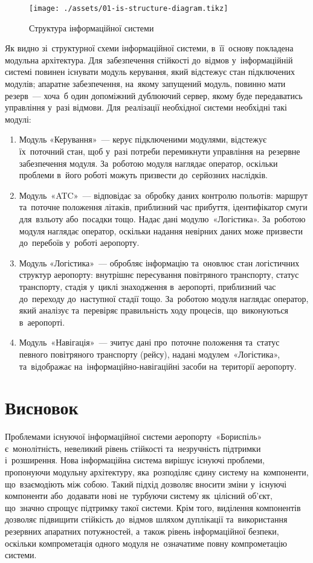 \documentclass[
	a4paper,
	oneside,
	DIV = 12,
	12pt,
	headings = normal,
]{scrartcl}
\newcommand{\allcaps}[1]{{\addfontfeatures{LetterSpace = 5, Kerning = Off}#1}}
\begin{document}
		\begin{figure}[!htbp]
			\centering
			\texttt{[image: ./assets/01-is-structure-diagram.tikz]}
			\caption{Структура інформаційної системи}
			\label{fig:01-is-structure-diagram}
		\end{figure}

		Як видно зі~структурної схеми інформаційної системи, в~її~основу покладена модульна архітектура. Для~забезпечення стійкості до~відмов у~інформаційній системі повинен існувати модуль керування, який відстежує стан підключених модулів; апаратне забезпечення, на~якому запущений модуль, повинно мати резерв~— хоча~б один допоміжний дублюючий сервер, якому буде передаватись управління у~разі відмови. Для~реалізації необхідної системи необхідні такі модулі:
		\begin{enumerate}
			\item Модуль «Керування»~— керує підключеними модулями, відстежує їх~поточний стан, щоб у~разі потреби перемикнути управління на~резервне забезпечення модуля. За~роботою модуля наглядає оператор, оскільки проблеми в~його роботі можуть призвести до~серйозних наслідків.
			\item Модуль~«\allcaps{ATC}»~— відповідає за~обробку даних контролю польотів: маршрут та~поточне положення літаків, приблизний час прибуття, ідентифікатор смуги для~взльоту або~посадки тощо. Надає дані модулю~«Логістика». За~роботою модуля наглядає оператор, оскільки надання невірних даних може призвести до~перебоїв у~роботі аеропорту.
			\item Модуль «Логістика»~— обробляє інформацію та~оновлює стан логістичних структур аеропорту: внутрішнє пересування повітряного транспорту, статус транспорту, стадія у~циклі знаходження в~аеропорті, приблизний час до~переходу до~наступної стадії тощо. За~роботою модуля наглядає оператор, який аналізує та~перевіряє правильність ходу процесів, що~виконуються в~аеропорті.
			\item Модуль~«Навігація»~— зчитує дані про~поточне положення та~статус певного повітряного транспорту (рейсу), надані модулем~«Логістика», та~відображає на~інформаційно-навігаційні засоби на~території аеропорту.
		\end{enumerate}

	\section{Висновок}
		Проблемами існуючої інформаційної системи аеропорту~«Бориспіль» є~монолітність, невеликий рівень стійкості та~незручність підтримки і~розширення. Нова інформаційна система вирішує існуючі проблеми, пропонуючи модульну архітектуру, яка~розподіляє єдину систему на~компоненти, що~взаємодіють між собою. Такий підхід дозволяє вносити зміни у~існуючі компоненти або~додавати нові не~турбуючи систему як~цілісний об'єкт, що~значно спрощує підтримку такої системи. Крім того, виділення компонентів дозволяє підвищити стійкість до~відмов шляхом дуплікації та~використання резервних апаратних потужностей, а~також рівень інформаційної безпеки, оскільки компрометація одного модуля не~означатиме повну компрометацію системи.
\end{document}
